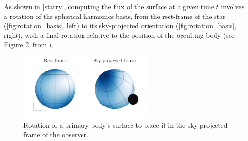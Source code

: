 \documentclass[modern]{aastex631}
\begin{document}
As shown in \autoref{starry}, computing the flux of the surface at a given time $t$ involves a rotation of the spherical harmonics basis, from the rest-frame of the star (\autoref{fig:rotation_basis}, left) to its sky-projected orientation (\autoref{fig:rotation_basis}, right), with a final rotation relative to the position of the occulting body (see Figure 2. from \citealt{starry}).
\begin{figure}[H]
    \begin{center}
        \includegraphics[width=0.6\textwidth]{../workflows/figures/rotation_basis.pdf}
        \caption{Rotation of a primary body's surface to place it in the sky-projected frame of the observer. }
        \label{fig:rotation_basis}
    \end{center}
\end{figure}
\end{document}
